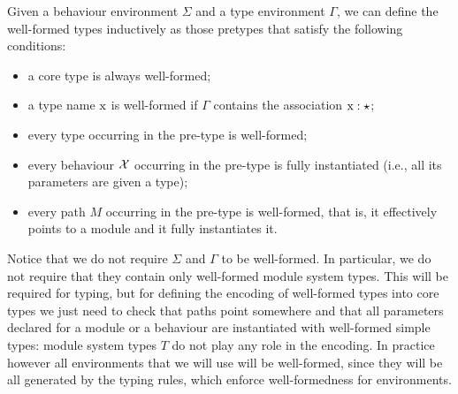 \documentclass[a4paper,10pt]{article}
\begin{document}
Given a behaviour environment $\Sigma$ and a type environment $\Gamma$, we can define the well-formed types inductively as those pretypes that satisfy the following conditions:
\begin{itemize}
\item a core type is always well-formed;
\item a type name $\text{\rm x}$ is well-formed if $\Gamma$ contains the association $\text{\rm x}:\star$;
\item every type occurring in the pre-type is well-formed;
\item every behaviour $\mathcal{X}$ occurring in the pre-type is fully instantiated (i.e., all its parameters are given a type);
\item every path $M$ occurring in the pre-type is well-formed, that is, it effectively points to a module and it fully instantiates it.
\end{itemize}
Notice that we do not require $\Sigma$ and $\Gamma$ to be well-formed. In particular, we do not require that they contain only well-formed module system types. This will be required for typing, but for defining the encoding of well-formed types into core types we just need to check that paths point somewhere and that all parameters declared for a module or a behaviour are instantiated with well-formed simple types: module system types $T$ do not play any role in the encoding. In practice however all environments that we will use will be well-formed, since they will be all generated by the typing rules, which enforce well-formedness for environments.
\end{document}
